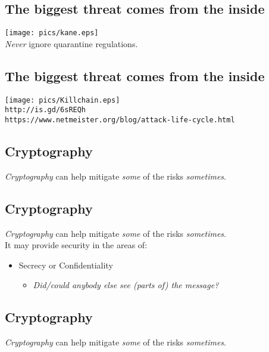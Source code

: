 \documentclass[xga]{xdvislides}
\begin{document}
\subsection{The biggest threat comes from the inside}
\vspace*{\fill}
\begin{center}
	\texttt{[image: pics/kane.eps]} \\
\small
	{\em Never} ignore quarantine regulations.
\Normalsize
\end{center}
\vspace*{\fill}

\subsection{The biggest threat comes from the inside}
\vspace*{\fill}
\begin{center}
	\texttt{[image: pics/Killchain.eps]} \\
\small
	\verb+http://is.gd/6sREQh+ \\
	\verb+https://www.netmeister.org/blog/attack-life-cycle.html+
\Normalsize
\end{center}
\vspace*{\fill}

\subsection{Cryptography}
\Normalsize
{\em Cryptography} can help mitigate {\em some} of the risks {\em sometimes}.

\subsection{Cryptography}
{\em Cryptography} can help mitigate {\em some} of the risks {\em sometimes}.
\\

It may provide security in the areas of:
\begin{itemize}
	\item Secrecy or Confidentiality
		\begin{itemize}
			\item {\em Did/could anybody else see (parts of) the message?}
		\end{itemize}
\end{itemize}

\subsection{Cryptography}
{\em Cryptography} can help mitigate {\em some} of the risks {\em sometimes}.
\\
\end{document}

